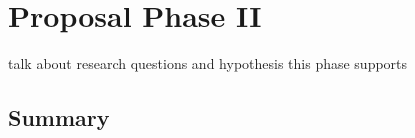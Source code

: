 \section{Proposal Phase II}\label{proposal:p2}
talk about research questions and hypothesis this phase supports

\subsection{Summary}
